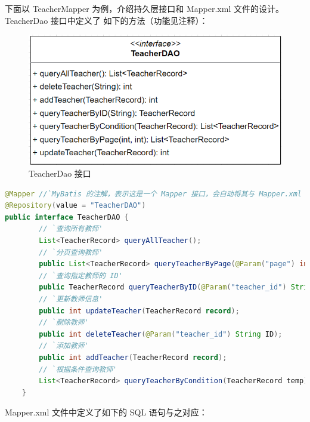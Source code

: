 \documentclass[12pt, a4paper]{article}
\begin{document}
下面以 TeacherMapper 为例，介绍持久层接口和 Mapper.xml 文件的设计。TeacherDao 接口中定义了
如下的方法（功能见注释）：
\begin{figure}[H]
	\centering
	\includegraphics[width = 0.6 \textwidth]{TeacherDao.png}
	\caption{TeacherDao 接口}
\end{figure}
\begin{lstlisting}[language = Java]
@Mapper //`MyBatis 的注解，表示这是一个 Mapper 接口，会自动将其与 Mapper.xml 文件关联'
@Repository(value = "TeacherDAO")
public interface TeacherDAO {
		// `查询所有教师'
		List<TeacherRecord> queryAllTeacher();
		// `分页查询教师'
		public List<TeacherRecord> queryTeacherByPage(@Param("page") int page, @Param("size") int size);
		// `查询指定教师的 ID'
		public TeacherRecord queryTeacherByID(@Param("teacher_id") String ID);
		// `更新教师信息'
		public int updateTeacher(TeacherRecord record);
		// `删除教师'
		public int deleteTeacher(@Param("teacher_id") String ID);
		// `添加教师'
		public int addTeacher(TeacherRecord record);
		// `根据条件查询教师'
		List<TeacherRecord> queryTeacherByCondition(TeacherRecord temp);
	}
\end{lstlisting}
Mapper.xml 文件中定义了如下的 SQL 语句与之对应：
\end{document}
